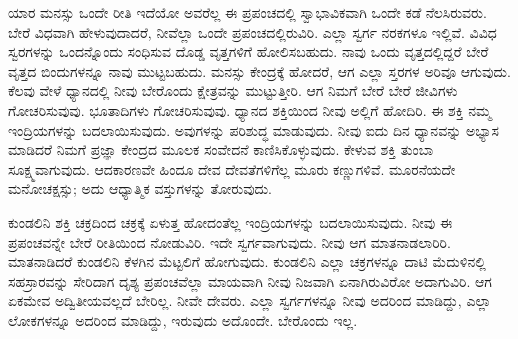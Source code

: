 ಯಾರ ಮನಸ್ಸು ಒಂದೇ ರೀತಿ ಇದೆಯೋ ಅವರೆಲ್ಲ ಈ ಪ್ರಪಂಚದಲ್ಲಿ ಸ್ವಾಭಾವಿಕವಾಗಿ ಒಂದೇ ಕಡೆ ನೆಲಸಿರುವರು. ಬೇರೆ ವಿಧವಾಗಿ ಹೇಳುವುದಾದರೆ, ನೀವೆಲ್ಲಾ ಒಂದೇ ಪ್ರಪಂಚದಲ್ಲಿರುವಿರಿ. ಎಲ್ಲಾ ಸ್ವರ್ಗ ನರಕಗಳೂ ಇಲ್ಲಿವೆ. ವಿವಿಧ ಸ್ವರಗಳನ್ನು ಒಂದನ್ನೊಂದು ಸಂಧಿಸುವ ದೊಡ್ಡ ವೃತ್ತಗಳಿಗೆ ಹೋಲಿಸಬಹುದು. ನಾವು ಒಂದು ವೃತ್ತದಲ್ಲಿದ್ದರೆ ಬೇರೆ ವೃತ್ತದ ಬಿಂದುಗಳನ್ನೂ ನಾವು ಮುಟ್ಟಬಹುದು. ಮನಸ್ಸು ಕೇಂದ್ರಕ್ಕೆ ಹೋದರೆ, ಆಗ ಎಲ್ಲಾ ಸ್ತರಗಳ ಅರಿವೂ ಆಗುವುದು. ಕೆಲವು ವೇಳೆ ಧ್ಯಾನದಲ್ಲಿ ನೀವು ಬೇರೊಂದು ಕ್ಷೇತ್ರವನ್ನು ಮುಟ್ಟುತ್ತೀರಿ. ಆಗ ನಿಮಗೆ ಬೇರೆ ಬೇರೆ ಜೀವಿಗಳು ಗೋಚರಿಸುವುವು. ಭೂತಾದಿಗಳು ಗೋಚರಿಸುವುವು. ಧ್ಯಾನದ ಶಕ್ತಿಯಿಂದ ನೀವು ಅಲ್ಲಿಗೆ ಹೋದಿರಿ. ಈ ಶಕ್ತಿ ನಮ್ಮ ಇಂದ್ರಿಯಗಳನ್ನು ಬದಲಾಯಿಸುವುದು. ಅವುಗಳನ್ನು ಪರಿಶುದ್ಧ ಮಾಡುವುದು. ನೀವು ಐದು ದಿನ ಧ್ಯಾನವನ್ನು ಅಭ್ಯಾಸ ಮಾಡಿದರೆ ನಿಮಗೆ ಪ್ರಜ್ಞಾ ಕೇಂದ್ರದ ಮೂಲಕ ಸಂವೇದನೆ ಕಾಣಿಸಿಕೊಳ್ಳುವುದು. ಕೇಳುವ ಶಕ್ತಿ ತುಂಬಾ ಸೂಕ್ಷ್ಮವಾಗುವುದು. ಆದಕಾರಣವೇ ಹಿಂದೂ ದೇವ ದೇವತೆಗಳಿಗೆಲ್ಲ ಮೂರು ಕಣ್ಣುಗಳಿವೆ. ಮೂರನೆಯದೇ ಮನೋಚಕ್ಷಸ್ಸು; ಅದು ಆಧ್ಯಾತ್ಮಿಕ ವಸ್ತುಗಳನ್ನು ತೋರುವುದು.

ಕುಂಡಲಿನಿ ಶಕ್ತಿ ಚಕ್ರದಿಂದ ಚಕ್ರಕ್ಕೆ ಏಳುತ್ತ ಹೋದಂತೆಲ್ಲ ಇಂದ್ರಿಯಗಳನ್ನು ಬದಲಾಯಿಸುವುದು. ನೀವು ಈ ಪ್ರಪಂಚವನ್ನೇ ಬೇರೆ ರೀತಿಯಿಂದ ನೋಡುವಿರಿ. ಇದೇ ಸ್ವರ್ಗವಾಗುವುದು. ನೀವು ಆಗ ಮಾತನಾಡಲಾರಿರಿ. ಮಾತನಾಡಿದರೆ ಕುಂಡಲಿನಿ ಕೆಳಗಿನ ಮೆಟ್ಟಲಿಗೆ ಹೋಗುವುದು. ಕುಂಡಲಿನಿ ಎಲ್ಲಾ ಚಕ್ರಗಳನ್ನೂ ದಾಟಿ ಮೆದುಳಿನಲ್ಲಿ ಸಹಸ್ರಾರವನ್ನು ಸೇರಿದಾಗ ದೃಶ್ಯ ಪ್ರಪಂಚವೆಲ್ಲಾ ಮಾಯವಾಗಿ ನೀವು ನಿಜವಾಗಿ ಏನಾಗಿರುವಿರೋ ಅದಾಗುವಿರಿ. ಆಗ ಏಕಮೇವ ಅದ್ವಿತೀಯವಲ್ಲದೆ ಬೇರಿಲ್ಲ. ನೀವೇ ದೇವರು. ಎಲ್ಲಾ ಸ್ವರ್ಗಗಳನ್ನೂ ನೀವು ಅದರಿಂದ ಮಾಡಿದ್ದು, ಎಲ್ಲಾ ಲೋಕಗಳನ್ನೂ ಅದರಿಂದ ಮಾಡಿದ್ದು, ಇರುವುದು ಅದೊಂದೇ. ಬೇರೊಂದು ಇಲ್ಲ.

